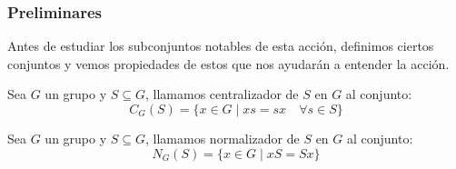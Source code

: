 \subsubsection{Preliminares}
\noindent
Antes de estudiar los subconjuntos notables de esta acción, definimos ciertos conjuntos y vemos propiedades de estos que nos ayudarán a entender la acción.

\begin{definicion}[Centralizador]
    Sea $G$ un grupo y $S\subseteq G$, llamamos centralizador de $S$ en $G$ al conjunto:
    \begin{equation*}
        C_G(S) = \{x\in G \mid xs = sx \quad \forall s\in S\}
    \end{equation*}
\end{definicion}

\begin{definicion}[Normalizador]
    Sea $G$ un grupo y $S\subseteq G$, llamamos normalizador de $S$ en $G$ al conjunto:
    \begin{equation*}
        N_G(S) = \{x\in G \mid xS = Sx\}
    \end{equation*}
\end{definicion}

